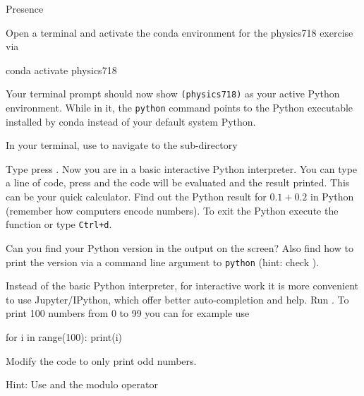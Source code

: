 \documentclass[a4paper, draft=False]{scrartcl}
\begin{document}
\begin{exam}[Presence]{Presence}
\begin{instructions}
\begin{problem*}
      Open a terminal and activate the conda environment for the physics718
      exercise via

      \begin{bashcode}
        conda activate physics718
      \end{bashcode}

      Your terminal prompt should now show \texttt{(physics718)} as your active
      Python environment. While in it, the \texttt{python} command points to the
      Python executable installed by conda instead of your default system
      Python.

      In your terminal, use  to navigate to the sub-directory
      \begin{parts}
        \item Type  press \keys{\return}. Now you are in a basic
          interactive Python interpreter. You can type a line of code, press
          \keys{\return} and the code will be evaluated and the result printed.
          This can be your quick calculator. Find out the Python result for
          $0.1 + 0.2$ in Python (remember how computers encode numbers). To exit
          the Python execute the  function or type \texttt{Ctrl+d}.
        \item Can you find your Python version in the output on the screen? Also
          find how to print the version via a command line argument to
          \texttt{python} (hint: check ).
        \item Instead of the basic Python interpreter, for interactive work it
          is more convenient to use Jupyter/IPython, which offer better
          auto-completion and help. Run . To print 100
          numbers from 0 to 99 you can for example use
          \begin{pythoncode}
            for i in range(100):
                print(i)
          \end{pythoncode}

          Modify the code to only print odd numbers.

          Hint: Use  and
          the modulo operator \py{%
          interactively, e.g.\ type \py{9 %
          Also remember that 0's are treated as boolean \py{False} inside
          conditions while all other numbers are \py{True}, you can validate
          this with e.g.\ \py{print(bool(0))} and \py{print(bool(1))}.

}}
\end{parts}
\end{problem*}
\end{instructions}
\end{exam}
\end{document}
